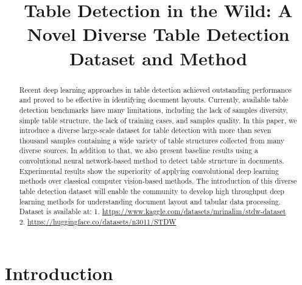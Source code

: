 \documentclass[a4paper,conference]{IEEEtran}
\begin{document}
\title{Table Detection in the Wild: A Novel Diverse Table Detection Dataset and Method}


\author{
}













\maketitle

\begin{abstract}
Recent deep learning approaches in table detection achieved outstanding performance and proved to be effective in identifying document layouts. Currently, available table detection benchmarks have many limitations, including the lack of samples diversity, simple table structure, the lack of training cases, and samples quality. In this paper, we introduce a diverse large-scale dataset for table detection with more than seven thousand samples containing a wide variety of table structures collected from many diverse sources. In addition to that, we also present baseline results using a convolutional neural network-based method to detect table structure in documents. Experimental results show the superiority of applying convolutional deep learning methods over classical computer vision-based methods. The introduction of this diverse table detection dataset will enable the community to develop high throughput deep learning methods for understanding document layout and tabular data processing. \\
{\normalfont Dataset is available at: 1. \url{https://www.kaggle.com/datasets/mrinalim/stdw-dataset} \\ 2. \url{https://huggingface.co/datasets/n3011/STDW}}
\end{abstract}




\IEEEpeerreviewmaketitle



\section{Introduction}
\end{document}
